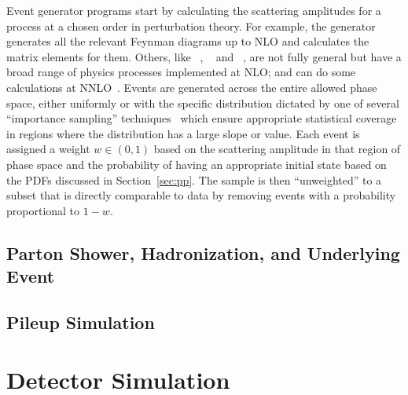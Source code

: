 Event generator programs start by calculating the scattering amplitudes for a process at a chosen order in perturbation theory.
For example, the generator {\MGAMC}~\cite{Alwall:2014hca} generates all the relevant Feynman diagrams up to NLO and calculates the matrix elements for them.
Others, like {\POWHEG}~\cite{Nason:2004rx,Frixione:2007vw,Alioli:2010xd}, {\SHERPA}~\cite{Gleisberg:2008ta} and {\MCFM}~\cite{Campbell:1999ah,Campbell:2011bn,Campbell:2015qma}, are not fully general but have a broad range of physics processes implemented at NLO\@; {\SHERPA} and {\MCFM} can do some calculations at NNLO~\cite{Boughezal:2016wmq}.
Events are generated across the entire allowed phase space, either uniformly or with the specific distribution dictated by one of several ``importance sampling'' techniques~\cite{Lepage:1977sw,Olive:2016xmw} which ensure appropriate statistical coverage in regions where the distribution has a large slope or value.
Each event is assigned a weight $w \in (0,1)$ based on the scattering amplitude in that region of phase space and the probability of having an appropriate initial state based on the PDFs discussed in Section~\ref{sec:pp}.
The sample is then ``unweighted'' to a subset that is directly comparable to data by removing events with a probability proportional to $1 - w$.


\subsection{Parton Shower, Hadronization, and Underlying Event}\label{sec:partonShower}



\subsection{Pileup Simulation}




\section{Detector Simulation}
